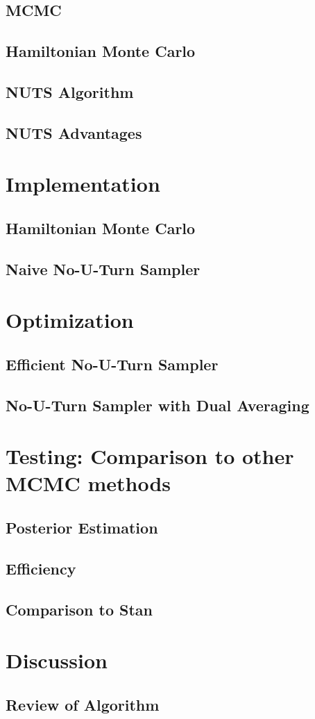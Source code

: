 \documentclass[12pt]{article}
\begin{document}
\subsection{MCMC}

\subsection{Hamiltonian Monte Carlo}

\subsection{NUTS Algorithm}

\subsection{NUTS Advantages}



\section{Implementation}
\subsection{Hamiltonian Monte Carlo}
\subsection{Naive No-U-Turn Sampler}


\section{Optimization}
\subsection{Efficient No-U-Turn Sampler}
\subsection{No-U-Turn Sampler with Dual Averaging}


\section{Testing: Comparison to other MCMC methods}
\subsection{Posterior Estimation} 
\subsection{Efficiency}
\subsection{Comparison to Stan}

\section{Discussion}
\subsection{Review of Algorithm}

\newpage

\end{document}
